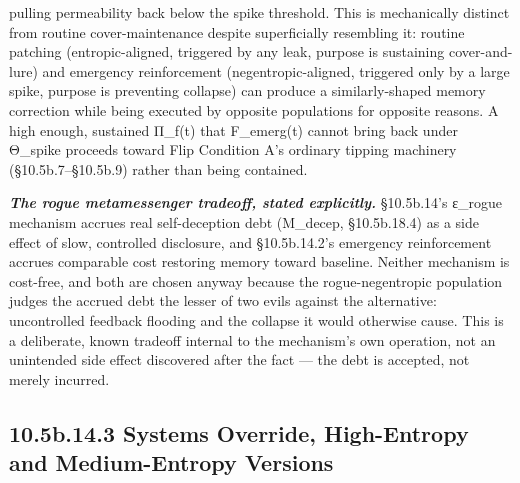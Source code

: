 \documentclass[
]{article}
\begin{document}
pulling permeability back below the spike threshold. This is
mechanically distinct from routine cover-maintenance despite
superficially resembling it: routine patching (entropic-aligned,
triggered by any leak, purpose is sustaining cover-and-lure) and
emergency reinforcement (negentropic-aligned, triggered only by a large
spike, purpose is preventing collapse) can produce a similarly-shaped
memory correction while being executed by opposite populations for
opposite reasons. A high enough, sustained Π\_f(t) that F\_emerg(t)
cannot bring back under Θ\_spike proceeds toward Flip Condition A's
ordinary tipping machinery (§10.5b.7--§10.5b.9) rather than being
contained.

\emph{\textbf{The rogue metamessenger tradeoff, stated explicitly.}}
§10.5b.14's ε\_rogue mechanism accrues real self-deception debt
(M\_decep, §10.5b.18.4) as a side effect of slow, controlled disclosure,
and §10.5b.14.2's emergency reinforcement accrues comparable cost
restoring memory toward baseline. Neither mechanism is cost-free, and
both are chosen anyway because the rogue-negentropic population judges
the accrued debt the lesser of two evils against the alternative:
uncontrolled feedback flooding and the collapse it would otherwise
cause. This is a deliberate, known tradeoff internal to the mechanism's
own operation, not an unintended side effect discovered after the fact
--- the debt is accepted, not merely incurred.

\hypertarget{b.14.3-systems-override-high-entropy-and-medium-entropy-versions}{%
\subsection{10.5b.14.3 Systems Override, High-Entropy and Medium-Entropy
Versions}\label{b.14.3-systems-override-high-entropy-and-medium-entropy-versions}}
\end{document}
